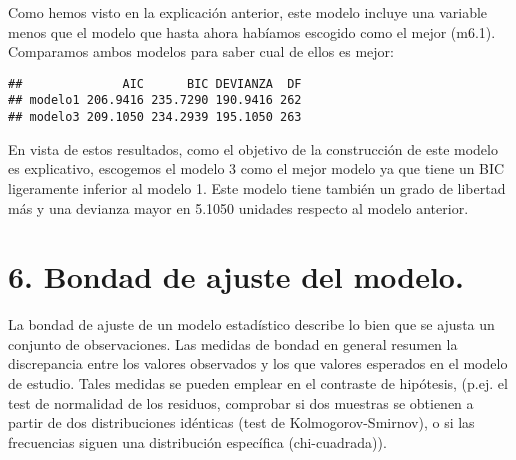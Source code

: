 \documentclass[]{article}
\newenvironment{Shaded}{\begin{snugshade}}{\end{snugshade}}
\newcommand{\KeywordTok}[1]{\textcolor[rgb]{0.13,0.29,0.53}{\textbf{#1}}}
\newcommand{\DataTypeTok}[1]{\textcolor[rgb]{0.13,0.29,0.53}{#1}}
\newcommand{\DecValTok}[1]{\textcolor[rgb]{0.00,0.00,0.81}{#1}}
\newcommand{\StringTok}[1]{\textcolor[rgb]{0.31,0.60,0.02}{#1}}
\newcommand{\OperatorTok}[1]{\textcolor[rgb]{0.81,0.36,0.00}{\textbf{#1}}}
\newcommand{\NormalTok}[1]{#1}
\begin{document}
Como hemos visto en la explicación anterior, este modelo incluye una
variable menos que el modelo que hasta ahora habíamos escogido como el
mejor (m6.1). Comparamos ambos modelos para saber cual de ellos es
mejor:

\begin{Shaded}
\end{Shaded}

\begin{verbatim}
##              AIC      BIC DEVIANZA  DF
## modelo1 206.9416 235.7290 190.9416 262
## modelo3 209.1050 234.2939 195.1050 263
\end{verbatim}

En vista de estos resultados, como el objetivo de la construcción de
este modelo es explicativo, escogemos el modelo 3 como el mejor modelo
ya que tiene un BIC ligeramente inferior al modelo 1. Este modelo tiene
también un grado de libertad más y una devianza mayor en 5.1050 unidades
respecto al modelo anterior.

\section{6. Bondad de ajuste del
modelo.}\label{bondad-de-ajuste-del-modelo.}

La bondad de ajuste de un modelo estadístico describe lo bien que se
ajusta un conjunto de observaciones. Las medidas de bondad en general
resumen la discrepancia entre los valores observados y los que valores
esperados en el modelo de estudio. Tales medidas se pueden emplear en el
contraste de hipótesis, (p.ej. el test de normalidad de los residuos,
comprobar si dos muestras se obtienen a partir de dos distribuciones
idénticas (test de Kolmogorov-Smirnov), o si las frecuencias siguen una
distribución específica (chi-cuadrada)).
\end{document}
